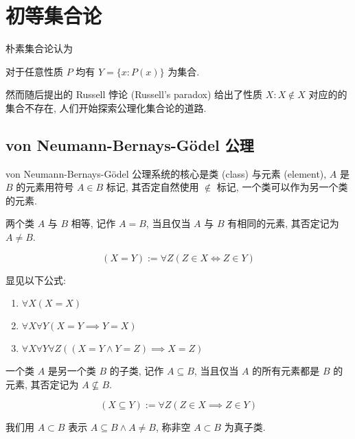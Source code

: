 \section{初等集合论}

朴素集合论认为

\begin{axiom}
    对于任意性质 \(P\) 均有 \(Y = \{x : P(x)\}\) 为集合.
\end{axiom}

然而随后提出的 Russell 悖论 (Russell's paradox) 给出了性质 \(X: X \notin X\) 对应的的集合不存在, 人们开始探索公理化集合论的道路. 

\subsection{von Neumann-Bernays-Gödel 公理}

von Neumann-Bernays-Gödel 公理系统的核心是类 (class) 与元素 (element), \(A\) 是 \(B\) 的元素用符号 \(A \in B\) 标记,
其否定自然使用 \(\notin\) 标记, 一个类可以作为另一个类的元素.

\begin{definition}
    两个类 \(A\) 与 \(B\) 相等, 记作 \(A = B\), 当且仅当 \(A\) 与 \(B\) 有相同的元素, 其否定记为 \(A \neq B\).

    \[
        (X = Y) := \forall Z (Z \in X \iff Z \in Y)
    \]
\end{definition}

\begin{corollary}
    显见以下公式:

    \begin{enumerate}
        \item \(\forall X (X = X)\)
        \item \(\forall X \forall Y (X = Y \implies Y = X)\)
        \item \(\forall X \forall Y \forall Z ((X = Y \land Y = Z) \implies X = Z)\)
    \end{enumerate}
\end{corollary}

\begin{definition}
    一个类 \(A\) 是另一个类 \(B\) 的子类, 记作 \(A \subseteq B\), 当且仅当 \(A\) 的所有元素都是 \(B\) 的元素, 其否定记为 \(A \nsubseteq B\).

    \[
        (X \subseteq Y) := \forall Z (Z \in X \implies Z \in Y)
    \]

    我们用 \(A \subset B\) 表示 \(A \subseteq B \land A \neq B\), 称非空 \(A \subset B\) 为真子类.
\end{definition}

